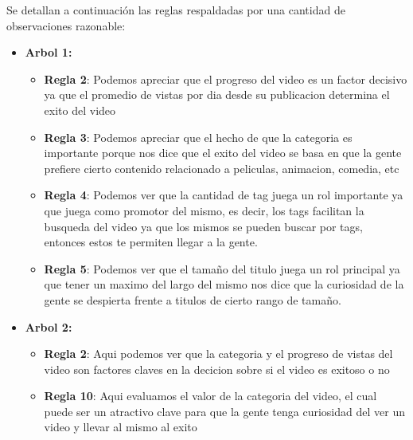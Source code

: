             Se detallan a continuación las reglas respaldadas por una cantidad
            de observaciones razonable:
            \begin{itemize}
                \item \textbf{Arbol 1:}
                \begin{itemize}
                    \item \textbf{Regla 2}: Podemos apreciar que el progreso
                    del video es un factor decisivo ya que el promedio de vistas
                    por dia desde su publicacion determina el exito del video
                    \item \textbf{Regla 3}: Podemos apreciar que el hecho de que
                    la categoria es importante porque nos dice que el exito del
                    video se basa en que la gente prefiere cierto contenido
                    relacionado a peliculas, animacion, comedia, etc
                    \item \textbf{Regla 4}: Podemos ver que la cantidad de tag
                    juega un rol importante ya que juega como promotor del mismo,
                    es decir, los tags facilitan la busqueda del video ya que los
                    mismos se pueden buscar por tags, entonces estos te permiten
                    llegar a la gente.
                    \item \textbf{Regla 5}: Podemos ver que el tamaño del titulo
                    juega un rol principal ya que tener un maximo del largo del
                    mismo nos dice que la curiosidad de la gente se despierta
                    frente a titulos de cierto rango de tamaño.
                \end{itemize}
                \item \textbf{Arbol 2:}
                \begin{itemize}
                    \item \textbf{Regla 2}: Aqui podemos ver que la categoria y
                    el progreso de vistas del video son factores claves en la
                    decicion sobre si el video es exitoso o no
                    \item \textbf{Regla 10}: Aqui evaluamos el valor de la
                    categoria del video, el cual puede ser un atractivo clave
                    para que la gente tenga curiosidad del ver un video y llevar
                    al mismo al exito
                \end{itemize}
            \end{itemize}


